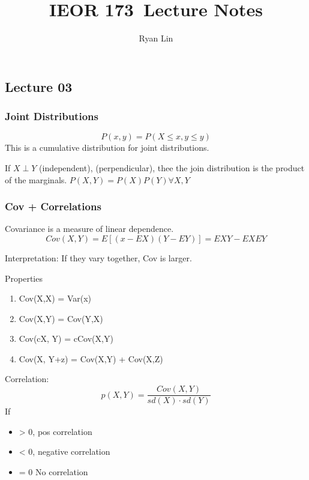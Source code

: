 \documentclass{report}
\title{\Huge{IEOR 173}\ Lecture Notes}
\author{\huge{Ryan Lin}}
\date{}
\begin{document}
\maketitle
\newpage%
\tableofcontents
\pagebreak

\chapter{}
\section{Lecture 03}
\subsection{Joint Distributions}
\[P(x,y) = P(X \le x, y \le y)\]
This is a cumulative distribution for joint distributions. 

If $X \perp Y$ (independent), (perpendicular), thee the join distribution is the product of the marginals. $P(X,Y) = P(X)P(Y) \forall X, Y$ 

\subsection{Cov + Correlations} 
Covariance is a measure of linear dependence.
\[Cov(X,Y) = E[(x-EX)(Y-EY)] = EXY - EXEY\]

Interpretation: If they vary together, Cov is larger. 

Properties
\begin{enumerate}
	\item Cov(X,X) = Var(x)
	\item Cov(X,Y) = Cov(Y,X)
	\item Cov(cX, Y) = cCov(X,Y)
	\item Cov(X, Y+z) = Cov(X,Y) + Cov(X,Z)
\end{enumerate}

Correlation:
\[p(X,Y) = \frac{Cov(X,Y)}{sd(X) \cdot sd(Y)}\]
If 
\begin{itemize}
	\item  > 0, pos correlation
	\item < 0, negative correlation
	\item = 0 No correlation
\end{itemize}

\end{document}
